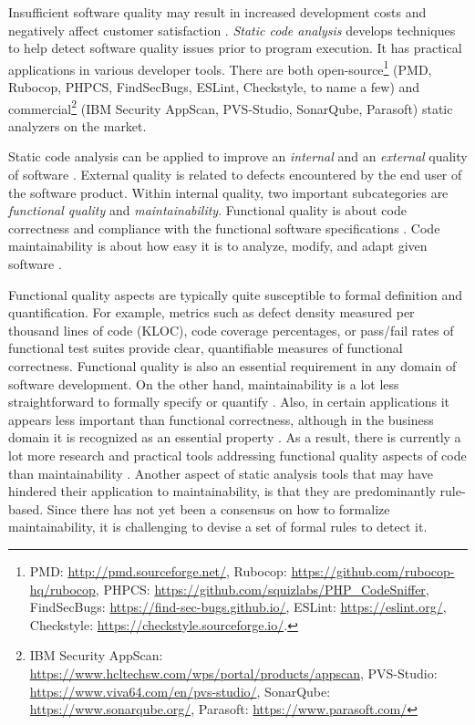 
Insufficient software quality may result in increased development costs and
negatively affect customer satisfaction \citep{The_Economics_of_Software_Quality}.
\textit{Static code analysis} develops techniques to help detect software quality
issues prior to program execution. It has practical applications in various developer tools. There are both open-source\footnote{PMD: \url{http://pmd.sourceforge.net/}, Rubocop: \url{https://github.com/rubocop-hq/rubocop},
PHPCS: \url{https://github.com/squizlabs/PHP_CodeSniffer},
FindSecBugs: \url{https://find-sec-bugs.github.io/}, ESLint: \url{https://eslint.org/}, Checkstyle: \url{https://checkstyle.sourceforge.io/}.}
(PMD, Rubocop, PHPCS, FindSecBugs, ESLint, Checkstyle, to name a few) and commercial\footnote{IBM Security AppScan: \url{https://www.hcltechsw.com/wps/portal/products/appscan},
PVS-Studio: \url{https://www.viva64.com/en/pvs-studio/},
SonarQube: \url{https://www.sonarqube.org/},
Parasoft: \url{https://www.parasoft.com/}}
(IBM Security AppScan, PVS-Studio, SonarQube, Parasoft) static analyzers
on the market.

Static code analysis can be applied to improve an \textit{internal} and an
\textit{external} quality of software \citep{Ilyas2016StaticCA}. External
quality is related to defects encountered by the end user of the software
product. Within internal quality, two important subcategories are
\textit{functional quality} and \textit{maintainability}. Functional quality is
about code correctness and compliance with the functional software
specifications \citep{Farhan}. Code maintainability is about how easy it is to
analyze, modify, and adapt given software \citep{Mohammadi2013AnAO}.

Functional quality aspects are typically quite susceptible to formal definition
and quantification. For example, metrics such as defect density measured per 
thousand lines of code (KLOC), code coverage percentages, or pass/fail rates 
of functional test suites provide clear, quantifiable measures of functional correctness. 
Functional quality is also an essential
requirement in any domain of software development. On the other hand,
maintainability is a lot less straightforward to formally specify or quantify 
\citep{ISO25010}.
Also, in certain applications it appears less important than
functional correctness, although in the business domain it is recognized as an
essential property \citep{Leveson2011}.
As a result, there is currently a lot more
research and practical tools addressing functional quality aspects of code than
maintainability \citep{Overview_Static_Code_Analysis_in_Software_Development}.
Another aspect of static analysis tools that may have hindered their application
to maintainability, is that they are predominantly rule-based. Since there has
not yet been a consensus on how to formalize maintainability, it is challenging
to devise a set of formal rules to detect it.


